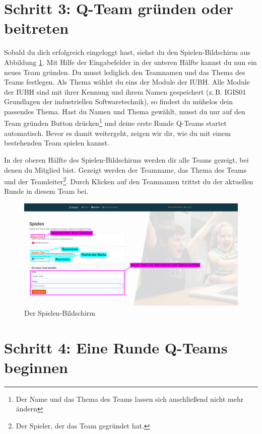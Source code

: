 \documentclass[a4paper,11pt,listof=numbered,glossary=totoc,parskip=half,toc=bib]{scrreprt}
\newcommand{\zB}{\mbox{z.\,B.}\xspace}
\begin{document}
\begin{appendices}
	\newpage
	\section*{Schritt 3: Q-Team gründen oder beitreten}
	
	Sobald du dich erfolgreich eingeloggt hast, siehst du den Spielen-Bildschirm aus Abbildung \ref{fig:guide_spielen}. Mit Hilfe der Eingabefelder in der unteren Hälfte kannst du nun ein neues Team gründen. Du musst lediglich den Teamnamen und das Thema des Teams festlegen. Als Thema wählst du eins der Module der IUBH. Alle Module der IUBH sind mit ihrer Kennung und ihrem Namen gespeichert (\zB IGIS01 Grundlagen der industriellen Softwaretechnik), so findest du mühelos dein passendes Thema. Hast du Namen und Thema gewählt, musst du nur auf den Team gründen Button drücken\footnote{Der Name und das Thema des Teams lassen sich anschließend nicht mehr ändern} und deine erste Runde Q-Teams startet automatisch. Bevor es damit weitergeht, zeigen wir dir, wie du mit einem bestehenden Team spielen kannst.
	
	In der oberen Hälfte des Spielen-Bildschirms werden dir alle Teams gezeigt, bei denen du Mitglied bist. Gezeigt werden der Teamname, das Thema des Teams und der Teamleiter\footnote{Der Spieler, der das Team gegründet hat.}. Durch Klicken auf den Teamnamen trittst du der aktuellen Runde in diesem Team bei.
	
	\begin{figure}[h!]
		\centering
		\includegraphics[width=\textwidth]{UserGuide/Spielen.png}
		\caption{Der Spielen-Bildschirm}
		\label{fig:guide_spielen}
	\end{figure}
	
	\newpage
	\section*{Schritt 4: Eine Runde Q-Teams beginnen}
	

\end{appendices}
\end{document}
